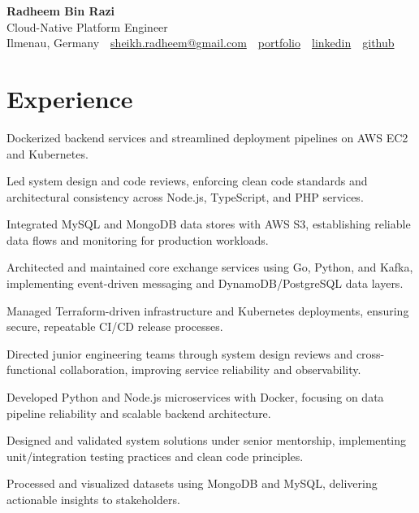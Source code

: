\documentclass[11pt,a4paper]{resume}
\makeatletter
\newcommand{\Portfolio}{https://radheem.github.io/my-cv}
\newcommand{\PortfolioText}{portfolio}
\newcommand{\GitHub}{https://github.com/radheem}
\newcommand{\LinkedIn}{https://www.linkedin.com/in/radheem-razi}
\newcommand{\Email}{sheikh.radheem@gmail.com}
\makeatother
\begin{document}
\begin{center}
  {\huge\bfseries Radheem Bin Razi}\\[3pt]
  {\large Cloud-Native Platform Engineer}\\[6pt]
  \small
  Ilmenau, Germany \,\textbar\,
  \href{mailto:\Email}{\Email} \,\textbar\,
  \href{\Portfolio}{\PortfolioText} \,\textbar\,
  \href{\LinkedIn}{linkedin} \,\textbar\,
  \href{\GitHub}{github}
\end{center}
\vspace{2pt}

\section{Experience}

\bullets
  \item Dockerized backend services and streamlined deployment pipelines on AWS EC2 and Kubernetes.
  \item Led system design and code reviews, enforcing clean code standards and architectural consistency across Node.js, TypeScript, and PHP services.
  \item Integrated MySQL and MongoDB data stores with AWS S3, establishing reliable data flows and monitoring for production workloads.
\bulletsend
\vspace{3pt}
\bullets
  \item Architected and maintained core exchange services using Go, Python, and Kafka, implementing event-driven messaging and DynamoDB/PostgreSQL data layers.
  \item Managed Terraform-driven infrastructure and Kubernetes deployments, ensuring secure, repeatable CI/CD release processes.
  \item Directed junior engineering teams through system design reviews and cross-functional collaboration, improving service reliability and observability.
\bulletsend
\vspace{3pt}
\bullets
  \item Developed Python and Node.js microservices with Docker, focusing on data pipeline reliability and scalable backend architecture.
  \item Designed and validated system solutions under senior mentorship, implementing unit/integration testing practices and clean code principles.
  \item Processed and visualized datasets using MongoDB and MySQL, delivering actionable insights to stakeholders.
\bulletsend
\vspace{3pt}
\end{document}
